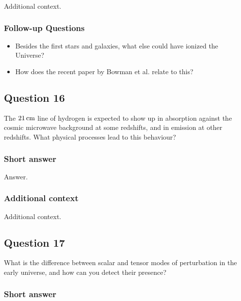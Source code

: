 \documentclass[a4paper,11pt]{article}
\begin{document}
Additional context.

\subsubsection{Follow-up Questions}

\begin{itemize}
    \item Besides the first stars and galaxies, what else could have ionized the Universe?
    \item How does the recent paper by Bowman et al. relate to this?
\end{itemize}


%
%

\newpage
\subsection{Question 16}

The $21\,{\rm cm}$ line of hydrogen is expected to show up in absorption against the cosmic microwave background at some redshifts, and in emission at other redshifts. What physical processes lead to this behaviour?

\subsubsection{Short answer}

Answer.

\subsubsection{Additional context}

Additional context.

%
%

\newpage
\subsection{Question 17}

What is the difference between scalar and tensor modes of perturbation in the early universe, and how can you detect their presence?

\subsubsection{Short answer}
\end{document}
